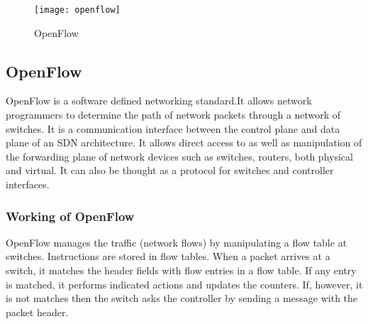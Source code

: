 \begin{figure}[h]
\begin{center}	
\texttt{[image: openflow]} 
\caption{OpenFlow}
\label{fig:openflow}
\end{center}
\end{figure}

\subsection{OpenFlow}
OpenFlow is a software defined networking standard.It allows network programmers to determine the path of network packets through a network of switches. It is a communication interface between the control plane and data plane of an SDN architecture. It allows direct access to as well as manipulation of the forwarding plane of network devices such as switches, routers, both physical and virtual. It can also be thought as a protocol for switches and controller interfaces.

\subsubsection{Working of OpenFlow}
OpenFlow manages the traffic (network flows) by manipulating a flow table at switches. Instructions are stored in flow tables. When a packet arrives at a switch, it matches the header fields with flow entries in a flow table. If any entry is matched, it performs indicated actions and updates the counters. If, however, it is not matches then the switch asks the controller by sending a message with the packet header.


